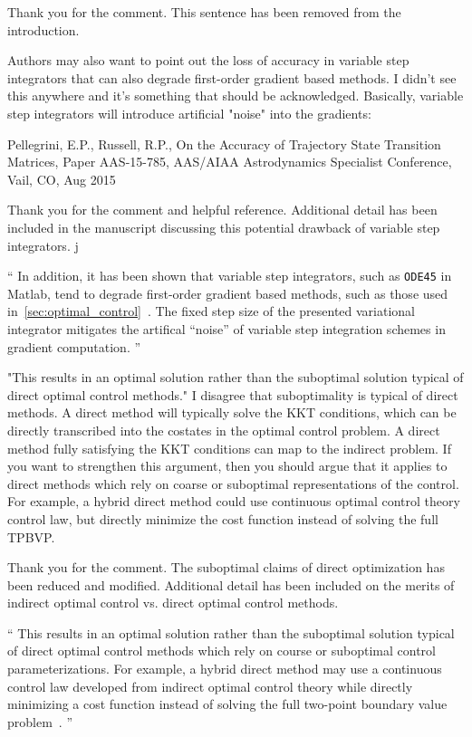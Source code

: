 \documentclass[11pt]{article}
\newenvironment{correction}{\begin{list}{}{\setlength{\leftmargin}{1cm}\setlength{\rightmargin}{1cm}}\vspace{\parsep}\item[]``}{''\end{list}}
\begin{document}
\begin{enumerate}
Thank you for the comment.
This sentence has been removed from the introduction.

\item
    \begin{itshape}
Authors may also want to point out the loss of accuracy in variable step integrators that can also degrade first-order gradient based methods.  I didn't see this anywhere and it's something that should be acknowledged.  Basically, variable step integrators will introduce artificial "noise" into the gradients:

Pellegrini, E.P., Russell, R.P., On the Accuracy of Trajectory State Transition Matrices, Paper AAS-15-785, AAS/AIAA Astrodynamics Specialist Conference, Vail, CO, Aug 2015
\end{itshape}

Thank you for the comment and helpful reference.
Additional detail has been included in the manuscript discussing this potential drawback of variable step integrators.
j
\begin{correction}
In addition, it has been shown that variable step integrators, such as \texttt{ODE45} in Matlab, tend to degrade first-order gradient based methods, such as those used in~\cref{sec:optimal_control}~\cite{pellegrini2016}.
The fixed step size of the presented variational integrator mitigates the artifical ``noise'' of variable step integration schemes in gradient computation.
\end{correction}

\item 
    \begin{itshape}
"This results in an optimal solution rather than the suboptimal solution typical of direct optimal control methods." I disagree that suboptimality is typical of direct methods.  A direct method will typically solve the KKT conditions, which can be directly transcribed into the costates in the optimal control problem.  A direct method fully satisfying the KKT conditions can map to the indirect problem. If you want to strengthen this argument, then you should argue that it applies to direct methods which rely on coarse or suboptimal representations of the control.  For example, a hybrid direct method could use continuous optimal control theory control law, but directly minimize the cost function instead of solving the full TPBVP.  
\end{itshape}

Thank you for the comment.
The suboptimal claims of direct optimization has been reduced and modified.
Additional detail has been included on the merits of indirect optimal control vs. direct optimal control methods.
\begin{correction}
This results in an optimal solution rather than the suboptimal solution typical of direct optimal control methods which rely on course or suboptimal control parameterizations.
For example, a hybrid direct method may use a continuous control law developed from indirect optimal control theory while directly minimizing a cost function instead of solving the full two-point boundary value problem~\cite{ozimek2010a}.
\end{correction}


\end{enumerate}
\end{document}
